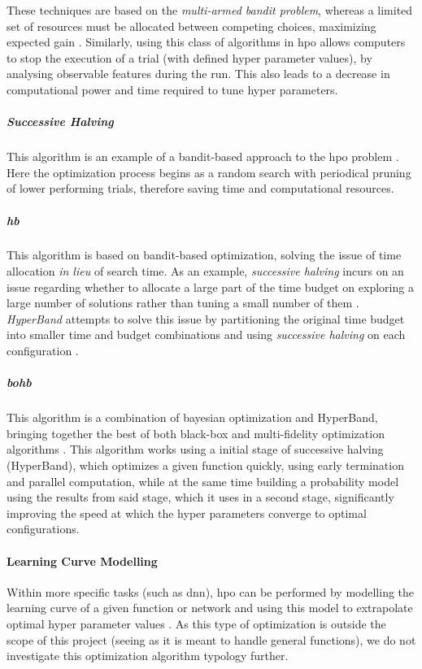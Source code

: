 These techniques are based on the \textit{multi-armed bandit problem}, whereas a limited set of resources must be allocated between competing choices, maximizing expected gain \parencite{Katehakis1987TheMB}. Similarly, using this class of algorithms in \acrshort{hpo} allows computers to stop the execution of a trial (with defined hyper parameter values), by analysing observable features during the run. This also leads to a decrease in computational power and time required to tune hyper parameters. 

\subparagraph{Successive Halving} 
This algorithm is an example of a bandit-based approach to the \acrshort{hpo} problem \parencite{jamieson2015nonstochastic}. Here the optimization process begins as a random search with periodical pruning of lower performing trials, therefore saving time and computational resources. 

\subparagraph{\acrshort{hb}}
This algorithm is based on bandit-based optimization, solving the issue of time allocation \textit{in lieu} of search time. As an example, \textit{successive halving} incurs on an issue regarding whether to allocate a large part of the time budget on exploring a large number of solutions rather than tuning a small number of them \parencite{elshawi2019automated}. \textit{HyperBand} attempts to solve this issue by partitioning the original time budget into smaller time and budget combinations and using \textit{successive halving} on each configuration \parencite{li2016hyperband}.

\subparagraph{\acrfull{bohb}}
This algorithm is a combination of bayesian optimization and HyperBand, bringing together the best of both black-box and multi-fidelity optimization algorithms \parencite{pmlr-v80-falkner18a}. This algorithm works using a initial stage of successive halving (HyperBand), which optimizes a given function quickly, using early termination and parallel computation, while at the same time building a probability model using the results from said stage, which it uses in a second stage, significantly improving the speed at which the hyper parameters converge to optimal configurations.

\paragraph{Learning Curve Modelling}
Within more specific tasks (such as \acrfull{dnn}), \acrshort{hpo} can be performed by modelling the learning curve of a given function or network and using this model to extrapolate optimal hyper parameter values \parencite{10.5555/2832581.2832731}. As this type of optimization is outside the scope of this project (seeing as it is meant to handle general functions), we do not investigate this optimization algorithm typology further.